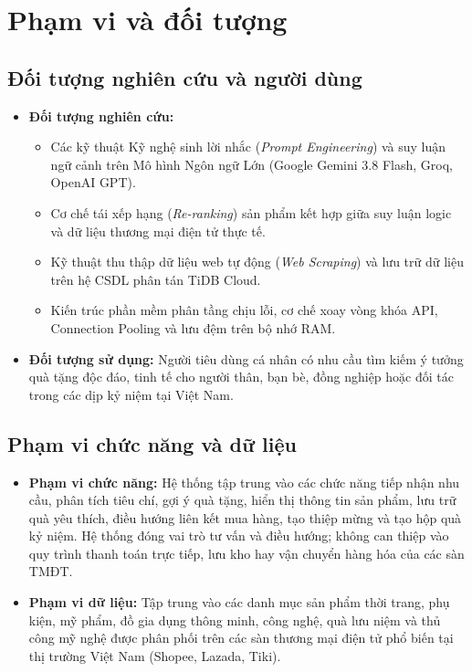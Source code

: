 
\section{Phạm vi và đối tượng}

\subsection{Đối tượng nghiên cứu và người dùng}

\begin{itemize}[leftmargin=1.2cm, itemsep=2pt]
    \item \textbf{Đối tượng nghiên cứu:}
    \begin{itemize}[leftmargin=0.6cm, itemsep=2pt]
        \item Các kỹ thuật Kỹ nghệ sinh lời nhắc (\textit{Prompt Engineering}) và suy luận ngữ cảnh trên Mô hình Ngôn ngữ Lớn (Google Gemini 3.8 Flash, Groq, OpenAI GPT).
        \item Cơ chế tái xếp hạng (\textit{Re-ranking}) sản phẩm kết hợp giữa suy luận logic và dữ liệu thương mại điện tử thực tế.
        \item Kỹ thuật thu thập dữ liệu web tự động (\textit{Web Scraping}) và lưu trữ dữ liệu trên hệ CSDL phân tán TiDB Cloud.
        \item Kiến trúc phần mềm phân tầng chịu lỗi, cơ chế xoay vòng khóa API, Connection Pooling và lưu đệm trên bộ nhớ RAM.
    \end{itemize}
    \item \textbf{Đối tượng sử dụng:} Người tiêu dùng cá nhân có nhu cầu tìm kiếm ý tưởng quà tặng độc đáo, tinh tế cho người thân, bạn bè, đồng nghiệp hoặc đối tác trong các dịp kỷ niệm tại Việt Nam.
\end{itemize}

\subsection{Phạm vi chức năng và dữ liệu}

\begin{itemize}[leftmargin=1.2cm, itemsep=2pt]
    \item \textbf{Phạm vi chức năng:} Hệ thống tập trung vào các chức năng tiếp nhận nhu cầu, phân tích tiêu chí, gợi ý quà tặng, hiển thị thông tin sản phẩm, lưu trữ quà yêu thích, điều hướng liên kết mua hàng, tạo thiệp mừng và tạo hộp quà kỷ niệm. Hệ thống đóng vai trò tư vấn và điều hướng; không can thiệp vào quy trình thanh toán trực tiếp, lưu kho hay vận chuyển hàng hóa của các sàn TMĐT.
    
    \item \textbf{Phạm vi dữ liệu:} Tập trung vào các danh mục sản phẩm thời trang, phụ kiện, mỹ phẩm, đồ gia dụng thông minh, công nghệ, quà lưu niệm và thủ công mỹ nghệ được phân phối trên các sàn thương mại điện tử phổ biến tại thị trường Việt Nam (Shopee, Lazada, Tiki).
\end{itemize}

